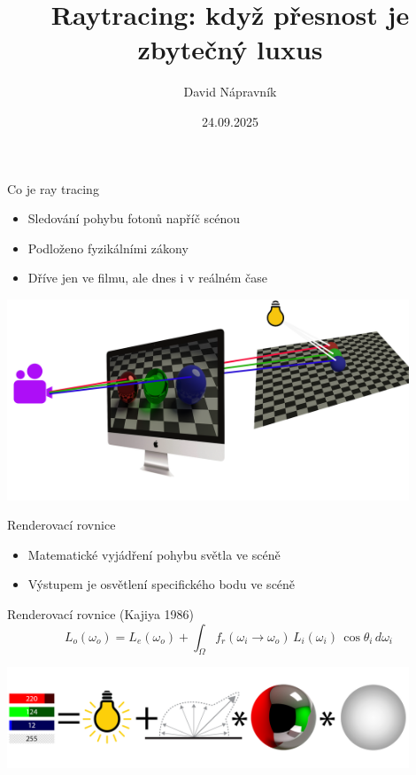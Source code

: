 \documentclass[czech]{beamer}
\title[Raytracing]{Raytracing: když přesnost je zbytečný luxus}
\author{David Nápravník}
\date{24.09.2025}
\institute[MFF]{Matematicko-fyzikální fakulta UK}
\begin{document}
\maketitle


\begin{frame}{Co je ray tracing}
\begin{itemize}
  \item Sledování pohybu fotonů napříč scénou
  \item Podloženo fyzikálními zákony
  \item Dříve jen ve filmu, ale dnes i v reálném čase
\end{itemize}
\vfill
\centering \includegraphics[width=0.9\textwidth]{img/raytracing composite.png}
\end{frame}


\begin{frame}{Renderovací rovnice}
\begin{itemize}
  \item Matematické vyjádření pohybu světla ve scéně
  \item Výstupem je osvětlení specifického bodu ve scéně
\end{itemize}

\begin{block}{Renderovací rovnice (Kajiya 1986)}
\[
L_o(\omega_o) = L_e(\omega_o) + \int_{\Omega} f_r(\omega_i \rightarrow \omega_o)\, L_i(\omega_i)\, \cos \theta_i\, d\omega_i\
\]
\end{block}
\centering \includegraphics[width=0.9\textwidth]{img/rendering equation.png}
\end{frame}
\end{document}
